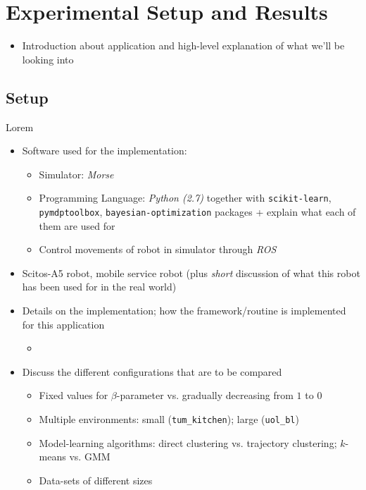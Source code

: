 \chapter{Experimental Setup and Results}
\label{ch:experimental-results}

\begin{itemize}
	\item Introduction about application and high-level explanation of what we'll be looking into
\end{itemize}

\section{Setup}
\label{sec:setup}

Lorem

\begin{itemize}
	\item Software used for the implementation:
	\begin{itemize}
		\item Simulator: \textit{Morse}
		\item Programming Language: \textit{Python (2.7)} together with \texttt{scikit-learn}, \texttt{pymdptoolbox}, \texttt{bayesian-optimization} packages + explain what each of them are used for
		\item Control movements of robot in simulator through \textit{ROS}
	\end{itemize}
	\item Scitos-A5 robot, mobile service robot (plus \textit{short} discussion of what this robot has been used for in the real world)
	\item Details on the implementation; how the framework/routine is implemented for this application
	\begin{itemize}
		\item 
	\end{itemize}
	\item Discuss the different configurations that are to be compared
	\begin{itemize}
		\item Fixed values for $\beta$-parameter vs. gradually decreasing from $1$ to $0$
		\item Multiple environments: small (\texttt{tum\_kitchen}); large (\texttt{uol\_bl})
		\item Model-learning algorithms: direct clustering vs. trajectory clustering; $k$-means vs. GMM
		\item Data-sets of different sizes
	\end{itemize}
\end{itemize}

